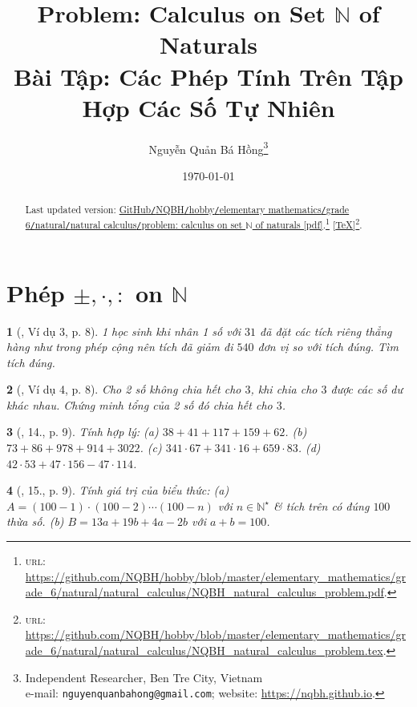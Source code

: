 \documentclass{article}
\title{Problem: Calculus on Set $\mathbb{N}$ of Naturals\\Bài Tập: Các Phép Tính Trên Tập Hợp Các Số Tự Nhiên}
\author{Nguyễn Quản Bá Hồng\footnote{Independent Researcher, Ben Tre City, Vietnam\\e-mail: \texttt{nguyenquanbahong@gmail.com}; website: \url{https://nqbh.github.io}.}}
\date{\today}
\newtheorem{baitoan}{}
\begin{document}
\maketitle
\begin{abstract}
	Last updated version: \href{https://github.com/NQBH/hobby/blob/master/elementary_mathematics/grade_6/natural/natural_calculus/NQBH_natural_calculus_problem.pdf}{GitHub{\tt/}NQBH{\tt/}hobby{\tt/}elementary mathematics{\tt/}grade 6{\tt/}natural{\tt/}natural calculus{\tt/}problem: calculus on set $\mathbb{N}$ of naturals [pdf]}.\footnote{\textsc{url}: \url{https://github.com/NQBH/hobby/blob/master/elementary_mathematics/grade_6/natural/natural_calculus/NQBH_natural_calculus_problem.pdf}.} [\href{https://github.com/NQBH/hobby/blob/master/elementary_mathematics/grade_6/natural/natural_calculus/NQBH_natural_calculus_problem.tex}{\TeX}]\footnote{\textsc{url}: \url{https://github.com/NQBH/hobby/blob/master/elementary_mathematics/grade_6/natural/natural_calculus/NQBH_natural_calculus_problem.tex}.}. 
\end{abstract}
\tableofcontents


\section{Phép $\pm,\cdot,:$ on $\mathbb{N}$}

\begin{baitoan}[\cite{Tuyen_Toan_6}, Ví dụ 3, p. 8]
	1 học sinh khi nhân 1 số với $31$ đã đặt các tích riêng thẳng hàng như trong phép cộng nên tích đã giảm đi $540$ đơn vị so với tích đúng. Tìm tích đúng.
\end{baitoan}

\begin{baitoan}[\cite{Tuyen_Toan_6}, Ví dụ 4, p. 8]
	Cho 2 số không chia hết cho $3$, khi chia cho $3$ được các số dư khác nhau. Chứng minh tổng của 2 số đó chia hết cho $3$.
\end{baitoan}

\begin{baitoan}[\cite{Tuyen_Toan_6}, 14., p. 9]
	Tính hợp lý: (a) $38 + 41 + 117 + 159 + 62$. (b) $73 + 86 + 978 + 914 + 3022$. (c) $341\cdot67 + 341\cdot16 + 659\cdot83$. (d) $42\cdot53 + 47\cdot156 - 47\cdot114$.
\end{baitoan}

\begin{baitoan}[\cite{Tuyen_Toan_6}, 15., p. 9]
	Tính giá trị của biểu thức: (a) $A = (100 - 1)\cdot(100 - 2)\cdots(100 - n)$ với $n\in\mathbb{N}^\star$ \& tích trên có đúng $100$ thừa số. (b) $B = 13a + 19b + 4a - 2b$ với $a + b = 100$.
\end{baitoan}
\end{document}
